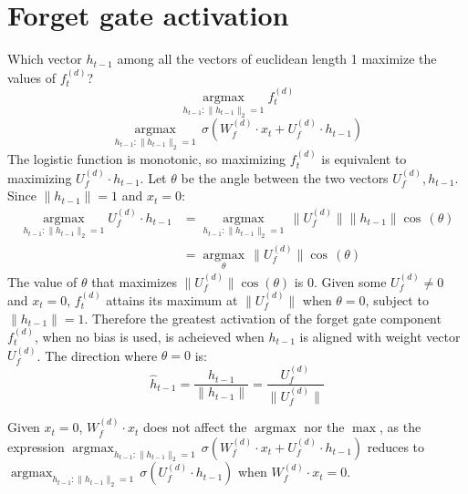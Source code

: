 \documentclass[9pt]{article}
\begin{document}
\section*{Forget gate activation}
Which vector $h_{t-1}$ among all the vectors of euclidean length 1 maximize the values of $f_t^{(d)}$?
\begin{equation*}
	\operatorname*{argmax}_{h_{t-1}:\lVert h_{t-1} \rVert_2 = 1} f_t^{(d)}
\end{equation*}
\begin{equation*}
	\operatorname*{argmax}_{h_{t-1}:\lVert h_{t-1} \rVert_2 = 1}\,\sigma(W_{f}^{(d)}\cdot{x_{t}} + U_{f}^{(d)}\cdot{h_{t-1}})
\end{equation*}
The logistic function is monotonic, so maximizing $f_t^{(d)}$ is equivalent to maximizing $U_{f}^{(d)}\cdot{h_{t-1}}$. Let $\theta$ be the angle between the two vectors $U_{f}^{(d)},{h_{t-1}}$. Since $\lVert h_{t-1}\rVert=1$ and $x_t=0$:
\begin{equation*}
\begin{split}
	\operatorname*{argmax}_{h_{t-1}:\lVert h_{t-1} \rVert_2 = 1} U_{f}^{(d)}\cdot{h_{t-1}} & = \operatorname*{argmax}_{h_{t-1}:\lVert h_{t-1} \rVert_2 = 1} \, \lVert U_f^{(d)} \rVert \lVert h_{t-1} \rVert \cos\,(\theta)\\
                                                                                     & = \operatorname*{argmax}_\theta \, \lVert U_f^{(d)} \rVert \cos\,(\theta)
\end{split}
\end{equation*}
The value of $\theta$ that maximizes $\lVert U_f^{(d)} \rVert \cos(\theta)$ is 0. Given some $U_f^{(d)}\neq0$ and $x_t=0$, $f_t^{(d)}$ attains its maximum at $\lVert U_f^{(d)} \rVert$ when $\theta=0$, subject to $\lVert h_{t-1} \rVert = 1$. Therefore the greatest activation of the forget gate component $f_t^{(d)}$, when no bias is used, is acheieved when $h_{t-1}$ is aligned with weight vector $U_f^{(d)}$. The direction where $\theta=0$ is:
\begin{equation*}
	\hat{h}_{t-1} = \frac{h_{t-1}}{\lVert h_{t-1} \rVert} = \frac{U_f^{(d)}}{\lVert U_f^{(d)} \rVert}
\end{equation*}

Given $x_t=0$, $W_{f}^{(d)} \cdot {x_{t}}$ does not affect the $\operatorname*{argmax}$ nor the $\operatorname*{max}$, as the expression $\operatorname*{argmax}_{h_{t-1}:\lVert h_{t-1} \rVert_2 = 1}\,\sigma(W_{f}^{(d)}\cdot{x_{t}} + U_{f}^{(d)}\cdot{h_{t-1}})$ reduces to $\operatorname*{argmax}_{h_{t-1}:\lVert h_{t-1} \rVert_2 = 1}\,\sigma(U_{f}^{(d)}\cdot{h_{t-1}})$ when $W_{f}^{(d)}\cdot{x_{t}} = 0$.
\end{document}
